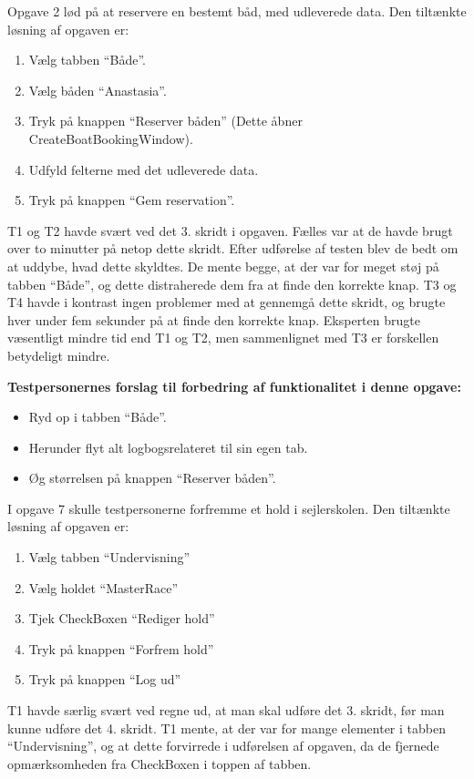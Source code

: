 Opgave 2 lød på at reservere en bestemt båd, med udleverede data.
Den tiltænkte løsning af opgaven er:
\begin{enumerate}
    \item Vælg tabben ``Både''.
    \item Vælg båden ``Anastasia''.
    \item Tryk på knappen ``Reserver båden'' (Dette åbner CreateBoatBookingWindow).
    \item Udfyld felterne med det udleverede data.
    \item Tryk på knappen ``Gem reservation''.
\end{enumerate}

T1 og T2 havde svært ved det 3. skridt i opgaven.
Fælles var at de havde brugt over to minutter på netop dette skridt.
Efter udførelse af testen blev de bedt om at uddybe, hvad dette skyldtes.
De mente begge, at der var for meget støj på tabben ``Både'', og dette distraherede dem fra at finde den korrekte knap.
T3 og T4 havde i kontrast ingen problemer med at gennemgå dette skridt, og brugte hver under fem sekunder på at finde den korrekte knap. 
Eksperten brugte væsentligt mindre tid end T1 og T2, men sammenlignet med T3 er forskellen betydeligt mindre.

\textbf{Testpersonernes forslag til forbedring af funktionalitet i denne opgave:}
\begin{itemize}
    \item Ryd op i tabben ``Både''. 
    \item Herunder flyt alt logbogsrelateret til sin egen tab.
    \item Øg størrelsen på knappen ``Reserver båden''.
\end{itemize}

I opgave 7 skulle testpersonerne forfremme et hold i sejlerskolen. 
Den tiltænkte løsning af opgaven er:
\begin{enumerate}
    \item Vælg tabben ``Undervisning''
    \item Vælg holdet ``MasterRace''
    \item Tjek CheckBoxen ``Rediger hold''
    \item Tryk på knappen ``Forfrem hold''
    \item Tryk på knappen ``Log ud''
\end{enumerate}

T1 havde særlig svært ved regne ud, at man skal udføre det 3. skridt, før man kunne udføre det 4. skridt.
T1 mente, at der var for mange elementer i tabben ``Undervisning'', og at dette forvirrede i udførelsen af opgaven, da de fjernede opmærksomheden fra CheckBoxen i toppen af tabben.

